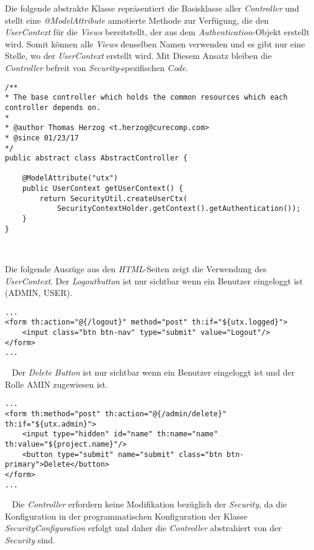 Die folgende abstrakte Klasse repräsentiert die Basisklasse aller \emph{Controller} und stellt eine \emph{@ModelAttribute} annotierte Methode zur Verfügung, die den \emph{UserContext} für die \emph{Views} bereitstellt, der aus dem \emph{Authentication}-Objekt erstellt wird. Somit können alle \emph{Views} denselben Namen verwenden und es gibt nur eine Stelle, wo der \emph{UserContext} erstellt wird. Mit Diesem Ansatz bleiben die \emph{Controller} befreit von \emph{Security}-spezifischen \emph{Code}.

\begin{verbatim}
/**
* The base controller which holds the common resources which each controller depends on.
*
* @author Thomas Herzog <t.herzog@curecomp.com>
* @since 01/23/17
*/
public abstract class AbstractController {
	
	@ModelAttribute("utx")
	public UserContext getUserContext() {
		return SecurityUtil.createUserCtx(
			SecurityContextHolder.getContext().getAuthentication());
	}
} 
\end{verbatim}
\ \newline

Die folgende Auszüge aus den \emph{HTML}-Seiten zeigt die Verwendung des \emph{UserContext}.
\newline
\newline
Der \emph{Logoutbutton} ist nur sichtbar wenn ein Benutzer eingeloggt ist (ADMIN, USER).
\begin{verbatim}
...
<form th:action="@{/logout}" method="post" th:if="${utx.logged}">
	<input class="btn btn-nav" type="submit" value="Logout"/>
</form>
...
\end{verbatim}
\ \newline
Der \emph{Delete Button} ist nur sichtbar wenn ein Benutzer eingeloggt ist und der Rolle AMIN zugewiesen ist.
\begin{verbatim}
...
<form th:method="post" th:action="@{/admin/delete}" th:if="${utx.admin}">
	<input type="hidden" id="name" th:name="name" th:value="${project.name}"/>
	<button type="submit" name="submit" class="btn btn-primary">Delete</button>
</form>
...
\end{verbatim}
\ \newline
Die \emph{Controller} erfordern keine Modifikation bezüglich der \emph{Security}, da die Konfiguration in der programmatischen Konfiguration der Klasse \emph{SecurityConfiguration} erfolgt und daher die \emph{Controller} abstrahiert von der \emph{Security} sind. 



